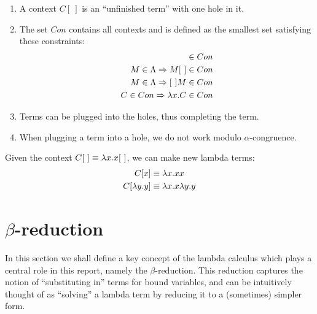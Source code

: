 \begin{definition}\mbox{}
	\begin{enumerate}
		\item A context $C[\ ]$ is an ``unfinished term'' with one hole in it. 
		\item The set $Con$ contains all contexts and is defined as the smallest
		set satisfying these constraints:
		\begin{align*}
			[\ ]&\in Con \\
			M\in\Lambda\Rightarrow M[\ ]&\in Con \\
			M\in\Lambda\Rightarrow [\ ]M&\in Con \\
			C\in Con\Rightarrow \lam{x}{C} &\in Con
		\end{align*}
		\item Terms can be plugged into the holes, thus completing the term. 
		\item When plugging a term into a hole, we do not work modulo 
		$\alpha$-congruence.
	\end{enumerate}
\end{definition}
\begin{example}
	Given the context $C[\ ]\equiv\lam{x}{x[\ ]}$, we can make new lambda terms:
	\begin{align*}
		C[x]&\equiv\lambda x.xx \\
		C[\lambda y.y]&\equiv\lambda x.x\lambda y.y
	\end{align*}
\end{example}

\section{$\beta$-reduction}

In this section we shall define a key concept of the lambda calculus which
plays a central role in this report, namely the $\beta$-reduction. This
reduction captures the notion of ``substituting in'' terms for bound variables,
and can be intuitively thought of as ``solving'' a lambda term by reducing it
to a (sometimes) simpler form.

